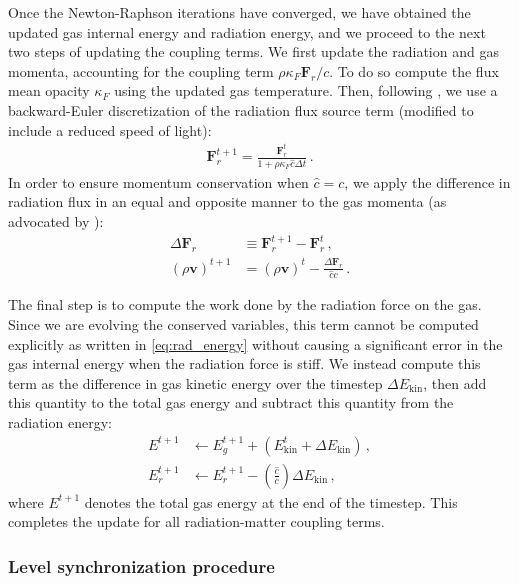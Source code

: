 \documentclass[fleqn,usenatbib]{mnras}
\newcommand{\vc}[1]{{\mathbf{#1}}}
\begin{document}
Once the Newton-Raphson iterations have converged, we have obtained the updated gas internal energy and radiation energy, and we proceed to the next two steps of updating the coupling terms. We first update the radiation and gas momenta, accounting for the coupling term $\rho \kappa_F \mathbf{F}_r/c$. To do so compute the flux mean opacity $\kappa_F$ using the updated gas temperature. Then, following \cite{Skinner_2019}, we use a backward-Euler discretization of the radiation flux source term (modified to include a reduced speed of light):
\begin{align}
\vc{F}_r^{t+1} = \frac{\vc{F}_r^t}{1 + \rho \kappa_F \hat c \Delta t} \, .
\end{align}
In order to ensure momentum conservation when $\hat c = c$, we apply the difference in radiation flux in an equal and opposite manner to the gas momenta (as advocated by \citealt{Skinner_2019}):
\begin{align}
\Delta \vc{F}_r &\equiv \vc{F}_r^{t+1} - \vc{F}_r^{t} \, , \\
{(\rho \vc{v})}^{t+1} &= {(\rho \vc{v})}^{t} - \frac{\Delta \vc{F}_r}{\hat c c} \, .
\end{align}

The final step is to compute the work done by the radiation force on the gas. Since we are evolving the conserved variables, this term cannot be computed explicitly as written in \autoref{eq:rad_energy} without causing a significant error in the gas internal energy when the radiation force is stiff. We instead compute this term as the difference in gas kinetic energy over the timestep $\Delta E_{\text{kin}}$, then add this quantity to the total gas energy and subtract this quantity from the radiation energy:
\begin{align}
E^{t+1} &\leftarrow E_g^{t+1} + \left( E_{\text{kin}}^t + \Delta E_{\text{kin}} \right) \, , \\
E_r^{t+1} &\leftarrow E_r^{t+1} - \left( \frac{\hat c}{c} \right) \Delta E_{\text{kin}} \, ,
\end{align}
where $E^{t+1}$ denotes the total gas energy at the end of the timestep. This completes the update for all radiation-matter coupling terms.


\subsubsection{Level synchronization procedure}
\label{sssec:sync}
\end{document}

